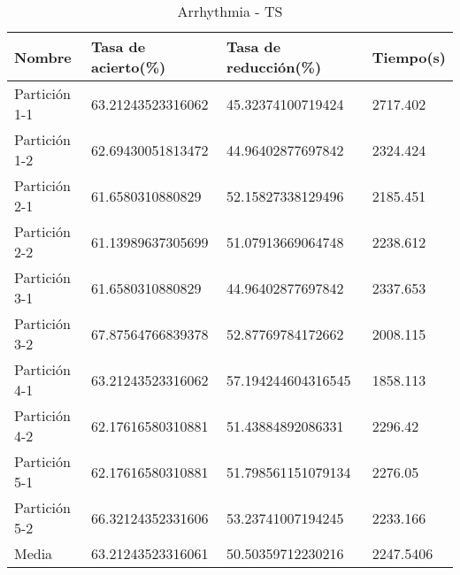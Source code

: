 \begin{table}[]
	\centering
	\begin{tabular}{l|lll}
		Nombre        & Tasa de acierto(\%) & Tasa de reducción(\%) & Tiempo(s) \\ \hline
		Partición 1-1 & 63.21243523316062   & 45.32374100719424     & 2717.402  \\
		Partición 1-2 & 62.69430051813472   & 44.96402877697842     & 2324.424  \\
		Partición 2-1 & 61.6580310880829    & 52.15827338129496     & 2185.451  \\
		Partición 2-2 & 61.13989637305699   & 51.07913669064748     & 2238.612  \\
		Partición 3-1 & 61.6580310880829    & 44.96402877697842     & 2337.653  \\
		Partición 3-2 & 67.87564766839378   & 52.87769784172662     & 2008.115  \\
		Partición 4-1 & 63.21243523316062   & 57.194244604316545    & 1858.113  \\
		Partición 4-2 & 62.17616580310881   & 51.43884892086331     & 2296.42   \\
		Partición 5-1 & 62.17616580310881   & 51.798561151079134    & 2276.05   \\
		Partición 5-2 & 66.32124352331606   & 53.23741007194245     & 2233.166  \\ \hline
		Media         & 63.21243523316061   & 50.50359712230216     & 2247.5406
	\end{tabular}
	\caption{Arrhythmia - TS}
	\label{ARRH-TS}
\end{table}